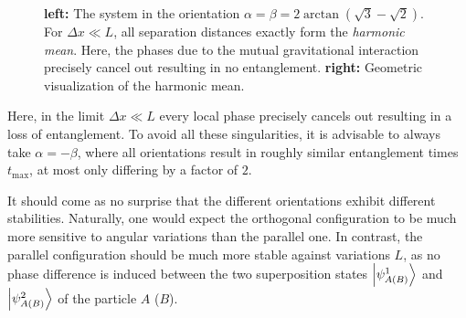 \begin{figure}[!htbp]
  \centering
  \def\svgwidth{\textwidth}
  
  \caption{\textbf{left:} The system in the orientation $\alpha=\beta=2\arctan(\sqrt{3}-\sqrt{2})$. For $\Delta x \ll L$, all separation distances exactly form the \textit{harmonic mean}. Here, the phases due to the mutual gravitational interaction precisely cancel out resulting in no entanglement. \textbf{right:} Geometric visualization of the harmonic mean.}
  \label{fig:4:harmonic-mean}
\end{figure}
Here, in the limit $\Delta x \ll L$ every local phase precisely cancels out resulting in a loss of entanglement. 
To avoid all these singularities, it is advisable to always take $\alpha=-\beta$, where all orientations result in roughly similar entanglement times $t_\mathrm{max}$, at most only differing by a factor of $2$.

It should come as no surprise that the different orientations exhibit different stabilities. Naturally, one would expect the orthogonal configuration to be much more sensitive to angular variations than the parallel one.
In contrast, the parallel configuration should be much more stable against variations $L$, as no phase difference is induced between the two superposition states $\ket{\psi^1_{A(B)}}$ and $\ket{\psi^2_{A(B)}}$ of the particle $A$ ($B$).

